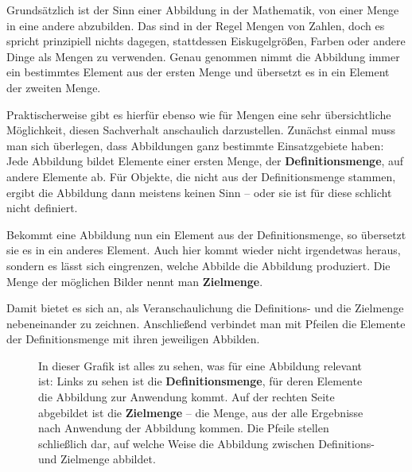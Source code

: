 \documentclass[../../main.tex]{subfiles}
\begin{document}
Grundsätzlich ist der Sinn einer Abbildung in der Mathematik, von einer Menge in eine andere abzubilden. Das sind in der Regel Mengen von Zahlen, doch es spricht prinzipiell nichts dagegen, stattdessen Eiskugelgrößen, Farben oder andere Dinge als Mengen zu verwenden. Genau genommen nimmt die Abbildung immer ein bestimmtes Element aus der ersten Menge und übersetzt es in ein Element der zweiten Menge. 

Praktischerweise gibt es hierfür ebenso wie für Mengen eine sehr übersichtliche Möglichkeit, diesen Sachverhalt anschaulich darzustellen. Zunächst einmal muss man sich überlegen, dass Abbildungen ganz bestimmte Einsatzgebiete haben: Jede Abbildung bildet Elemente einer ersten Menge, der \textbf{Definitionsmenge}, auf andere Elemente ab. Für Objekte, die nicht aus der Definitionsmenge stammen, ergibt die Abbildung dann meistens keinen Sinn -- oder sie ist für diese schlicht nicht definiert.

Bekommt eine Abbildung nun ein Element aus der Definitionsmenge, so übersetzt sie es in ein anderes Element. Auch hier kommt wieder nicht irgendetwas heraus, sondern es lässt sich eingrenzen, welche Abbilde die Abbildung produziert. Die Menge der möglichen Bilder nennt man \textbf{Zielmenge}.

Damit bietet es sich an, als Veranschaulichung die Definitions- und die Zielmenge nebeneinander zu zeichnen. Anschließend verbindet man mit Pfeilen die Elemente der Definitionsmenge mit ihren jeweiligen Abbilden.

\begin{figure}[ht]
    \centering
    
    \caption{In dieser Grafik ist alles zu sehen, was für eine Abbildung relevant ist: Links zu sehen ist die \textbf{Definitionsmenge}, für deren Elemente die Abbildung zur Anwendung kommt. Auf der rechten Seite abgebildet ist die \textbf{Zielmenge} -- die Menge, aus der alle Ergebnisse nach Anwendung der Abbildung kommen. Die Pfeile stellen schließlich dar, auf welche Weise die Abbildung zwischen Definitions- und Zielmenge abbildet.}
    \label{fig:function_scheme}
\end{figure}
\end{document}
